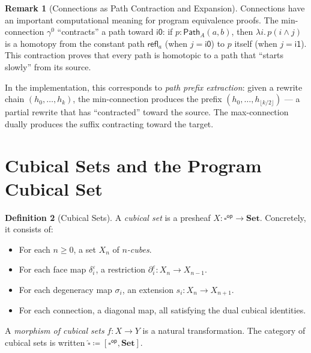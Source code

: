 \documentclass[11pt,a4paper]{report}
\theoremstyle{definition}
\newtheorem{definition}{Definition}[chapter]
\newtheorem{remark}[definition]{Remark}
\theoremstyle{plain}
\newcommand{\Path}{\mathsf{Path}}
\newcommand{\Set}{\mathbf{Set}}
\newcommand{\op}{\mathsf{op}}
\begin{document}
\begin{remark}[Connections as Path Contraction and Expansion]
\label{rem:connections-contraction}
Connections have an important computational meaning for program
equivalence proofs.  The min-connection $\gamma^0$ ``contracts''
a path toward $\mathsf{i0}$: if $p : \Path_A(a, b)$, then
$\lambda i.\, p(i \land j)$ is a homotopy from the constant path
$\mathsf{refl}_a$ (when $j = \mathsf{i0}$) to $p$ itself (when
$j = \mathsf{i1}$).  This contraction proves that every path is
homotopic to a path that ``starts slowly'' from its source.

In the implementation, this corresponds to \emph{path prefix
extraction}: given a rewrite chain $(h_0, \ldots, h_k)$, the
min-connection produces the prefix $(h_0, \ldots, h_{\lfloor k/2
\rfloor})$ --- a partial rewrite that has ``contracted'' toward the
source.  The max-connection dually produces the suffix contracting
toward the target.
\end{remark}

\section{Cubical Sets and the Program Cubical Set}

\begin{definition}[Cubical Sets]
\label{def:cubical-set}
A \emph{cubical set} is a presheaf $X : \square^{\op} \to \Set$.
Concretely, it consists of:
\begin{itemize}
  \item For each $n \geq 0$, a set $X_n$ of \emph{$n$-cubes}.
  \item For each face map $\delta_i^\varepsilon$, a restriction
    $\partial_i^\varepsilon : X_n \to X_{n-1}$.
  \item For each degeneracy map $\sigma_i$, an extension
    $s_i : X_n \to X_{n+1}$.
  \item For each connection, a diagonal map, all satisfying the
    dual cubical identities.
\end{itemize}
A \emph{morphism of cubical sets} $f : X \to Y$ is a natural transformation.
The category of cubical sets is written $\widehat{\square} \coloneqq [\square^{\op}, \Set]$.
\end{definition}
\end{document}
